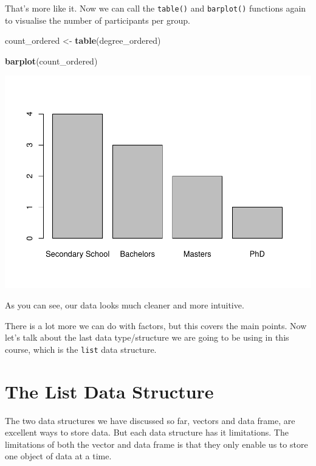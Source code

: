 \documentclass[
]{book}
\newenvironment{Shaded}{\begin{snugshade}}{\end{snugshade}}
\newcommand{\FunctionTok}[1]{\textcolor[rgb]{0.13,0.29,0.53}{\textbf{#1}}}
\newcommand{\NormalTok}[1]{#1}
\newcommand{\OtherTok}[1]{\textcolor[rgb]{0.56,0.35,0.01}{#1}}
\begin{document}
That's more like it. Now we can call the \texttt{table()} and \texttt{barplot()} functions again to visualise the number of participants per group.

\begin{Shaded}
\begin{Highlighting}[]
\NormalTok{count\_ordered }\OtherTok{\textless{}{-}} \FunctionTok{table}\NormalTok{(degree\_ordered)}

\FunctionTok{barplot}\NormalTok{(count\_ordered)}
\end{Highlighting}
\end{Shaded}

\includegraphics{rintro_demo_files/figure-latex/unnamed-chunk-136-1.pdf}

As you can see, our data looks much cleaner and more intuitive.

There is a lot more we can do with factors, but this covers the main points. Now let's talk about the last data type/structure we are going to be using in this course, which is the \texttt{list} data structure.

\hypertarget{the-list-data-structure}{%
\section{The List Data Structure}\label{the-list-data-structure}}

The two data structures we have discussed so far, vectors and data frame, are excellent ways to store data. But each data structure has it limitations. The limitations of both the vector and data frame is that they only enable us to store one object of data at a time.
\end{document}
